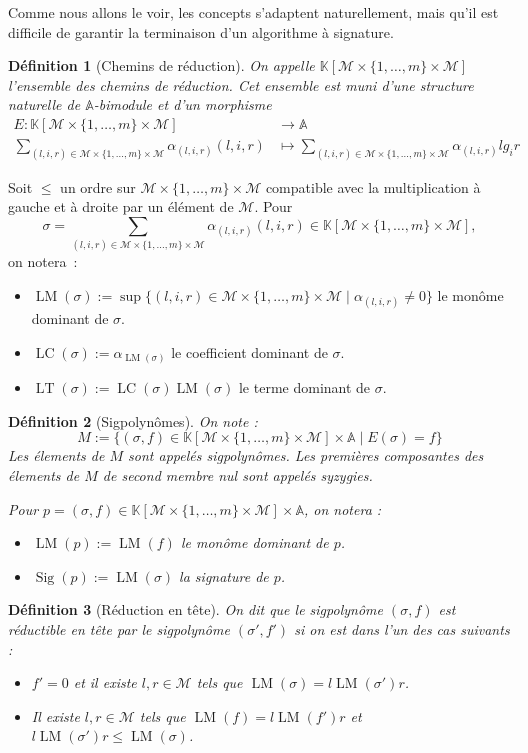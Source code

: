 \documentclass{article}
\newtheorem*{dfn}{Définition}
\newcommand{\K}{\mathbb{K}}
\newcommand{\A}{\mathbb{A}}
\newcommand{\M}{\mathcal{M}}
\newcommand{\CR}{\K[\M\times\{1, \dots, m\}\times\M]}
\DeclareMathOperator{\LM}{LM}
\DeclareMathOperator{\LC}{LC}
\DeclareMathOperator{\LT}{LT}
\DeclareMathOperator{\Sig}{Sig}
\begin{document}
Comme nous allons le voir, les concepts s'adaptent naturellement, mais qu'il est difficile de garantir la terminaison d'un algorithme à signature.

\begin{dfn}[Chemins de réduction]
	On appelle $\CR$ l'ensemble des chemins de réduction.
	Cet ensemble est muni d'une structure naturelle de $\A$-bimodule et d'un morphisme 
	\begin{align*}
		E : \CR &\rightarrow \A \\
		\sum_{(l, i, r) \in \M\times\{1,\dots,m\}\times\M} \alpha_{(l,i,r)}(l,i,r) &\mapsto \sum_{(l, i, r) \in \M\times\{1,\dots,m\}\times\M} \alpha_{(l,i,r)}lg_ir
	\end{align*}
\end{dfn}

Soit $\leq$ un ordre sur $\M\times\{1,\dots,m\}\times\M$ compatible avec la multiplication à gauche et à droite par un élément de $\M$.
Pour 
$$\sigma = \sum_{(l, i, r) \in \M\times\{1,\dots,m\}\times\M} \alpha_{(l,i,r)}(l,i,r) \in \CR,$$
on notera~:
\begin{itemize}
\item $\LM(\sigma) := \sup \{ (l, i, r) \in \M\times\{1,\dots,m\}\times\M \;|\; \alpha_{(l, i, r)} \neq 0 \}$ le monôme dominant de $\sigma$.
\item $\LC(\sigma) := \alpha_{\LM(\sigma)}$ le coefficient dominant de $\sigma$.
\item $\LT(\sigma) := \LC(\sigma)\LM(\sigma)$ le terme dominant de $\sigma$.
\end{itemize}

\begin{dfn}[Sigpolynômes]
	On note :
	$$M := \{(\sigma, f) \in \CR\times\A \;|\; E(\sigma) = f\}$$
	Les élements de $M$ sont appelés sigpolynômes.
	Les premières composantes des élements de $M$ de second membre nul sont appelés syzygies.
	
	Pour $p = (\sigma, f) \in \CR\times\A$, on notera :
	\begin{itemize}
	\item $\LM(p) := \LM(f)$ le monôme dominant de $p$.
	\item $\Sig(p) := \LM(\sigma)$ la signature de $p$.
	\end{itemize}
\end{dfn}

\begin{dfn}[Réduction en tête]
	On dit que le sigpolynôme $(\sigma, f)$ est réductible en tête par le sigpolynôme $(\sigma', f')$ si on est dans l'un des cas suivants :
	\begin{itemize}
	\item $f' = 0$ et il existe $l, r \in \M$ tels que $\LM(\sigma) = l\LM(\sigma')r$.
	\item Il existe $l, r \in \M$ tels que $\LM(f) = l\LM(f')r$ et $l\LM(\sigma')r \leq \LM(\sigma)$.
	\end{itemize}
\end{dfn}
\end{document}
